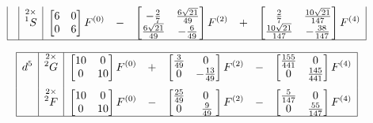 \begin{table}
\begin{equation*}
\begin{array}{|>{\displaystyle}c|>{\displaystyle}c|>{\displaystyle}r >{\displaystyle}c >{\displaystyle}r >{\displaystyle}c >{\displaystyle}r|}
    & \stackrel{2\times}{^1S} & \begin{bmatrix}6 & 0 \\ 0 & 6\end{bmatrix} F^{(0)} & - & \begin{bmatrix}-\frac{2}{7} & \frac{6\sqrt{21}}{49} \\ \frac{6\sqrt{21}}{49} & -\frac{6}{49}\end{bmatrix} F^{(2)} & + & \begin{bmatrix}\frac{2}{7} & \frac{10\sqrt{21}}{147} \\ \frac{10\sqrt{21}}{147} & -\frac{38}{147}\end{bmatrix} F^{(4)} \\
\hline
\end{array}
\end{equation*}

\begin{equation*}
\begin{array}{|>{\displaystyle}c|>{\displaystyle}c|>{\displaystyle}r >{\displaystyle}c >{\displaystyle}r >{\displaystyle}c >{\displaystyle}r|}
\hline
d^5 & \stackrel{2\times}{^2G} & \begin{bmatrix}10 & 0 \\ 0 & 10\end{bmatrix} F^{(0)} & + & \begin{bmatrix}\frac{3}{49} & 0 \\ 0 & -\frac{13}{49}\end{bmatrix} F^{(2)} & - & \begin{bmatrix}\frac{155}{441} & 0 \\ 0 & \frac{145}{441}\end{bmatrix} F^{(4)} \\[1.2em]
    & \stackrel{2\times}{^2F} & \begin{bmatrix}10 & 0 \\ 0 & 10\end{bmatrix} F^{(0)} & - & \begin{bmatrix}\frac{25}{49} & 0 \\ 0 & \phantom{0}\frac{9}{49}\phantom{,}\end{bmatrix} F^{(2)} & - & \begin{bmatrix}\frac{5}{147} & 0 \\ 0 & \frac{55}{147}\end{bmatrix} F^{(4)} \\
\hline
\end{array}
\end{equation*}


\end{table}
